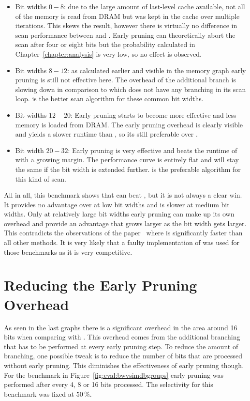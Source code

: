 \begin{itemize}
  \item Bit widths $0-8$: due to the large amount of last-level cache
  available, not all of the memory is read from DRAM but was kept in the cache
  over multiple iterations. This skews the result, however there is virtually
  no difference in scan performance between \simdscan{} and \bwv{}. Early
  pruning can theoretically abort the scan after four or eight bits but the
  probability calculated in Chapter~\ref{chapter:analysis} is very low, so no
  effect is observed.
  \item Bit widths $8-12$: as calculated earlier and visible in the memory
  graph early pruning is still not effective here. The overhead of the additional
  branch is slowing down \bwv{} in comparison to \simdscan{} which does not have
  any branching in its scan loop. \simdscan{} is the better scan algorithm for
  these common bit widths.
  \item Bit widths $12-20$: Early pruning starts to become more effective and
  less memory is loaded from DRAM. The early pruning overhead is clearly
  visible and yields a slower runtime than \simdscan{}, so its still preferable
  over \bwv{}.
  \item Bit width $20-32$: Early pruning is very effective and beats the
  runtime of \simdscan{} with a growing margin. The performance curve is
  entirely flat and will stay the same if the bit width is extended further.
  \bwv{} is the preferable algorithm for this kind of scan.
\end{itemize}

All in all, this benchmark shows that \bwv{} can beat \simdscan{}, but it is not
always a clear win. It provides no advantage over \simdscan{} at low bit widths
and is slower at medium bit widths. Only at relatively large bit widths early
pruning can make up its own overhead and provide an advantage that grows larger
as the bit width gets larger. This contradicts the observations of the
\bwv{} paper~\cite{BitWeaving} where \bwv{} is significantly faster than all
other methods. It is very likely that a faulty implementation of \simdscan{} was
used for those benchmarks as it is very competitive.

\section{Reducing the Early Pruning Overhead}

As seen in the last graphs there is a significant overhead in the area around
16 bits when comparing \bwv{} with \simdscan{}. This overhead comes from the
additional branching that has to be performed at every early pruning step. To
reduce the amount of branching, one possible tweak is to reduce the number of
bits that are processed without early pruning. This diminishes the
effectiveness of early pruning though. For the benchmark in
Figure~\ref{fig:eval:bwvsimdbgroups} early pruning was performed after every 4,
8 or 16 bits processed. The selectivity for this benchmark was fixed at $50\,\%$.

